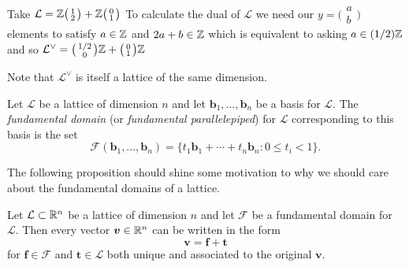 \begin{example}
    Take $\mathcal{L}= \mathbb{Z} 
        \big(\begin{smallmatrix} 1\\2 \end{smallmatrix}\big) + 
        \mathbb{Z} \big(\begin{smallmatrix} 0\\ 1 \end{smallmatrix}\big)$
        To calculate the dual of $\mathcal{L}$ we need our $y = \big(\begin{smallmatrix}
          a\\b\end{smallmatrix}\big)$ elements to satisfy $a \in \mathbb{Z}$ and $2a + b \in \mathbb{Z}$ which is equivalent to asking $a \in (1/2)\mathbb{Z}$ and so $\mathcal{L}^{\vee} = \big(\begin{smallmatrix}
          1/2\\0
        \end{smallmatrix}\big)\mathbb{Z} + \big(\begin{smallmatrix}
          0\\1
        \end{smallmatrix}\big) \mathbb{Z}$
\end{example}

Note that $\mathcal{L}^{\vee}$ is itself a lattice of the same dimension.

\begin{definition} \label{fundamental}
    Let $\mathcal{L}$ be a lattice of dimension $n$ and let $\bm{b}_1, \dots, \bm{b}_n$ be a basis for $\mathcal{L}$. The \textit{fundamental domain} (or \textit{fundamental parallelepiped}) for $\mathcal{L}$ corresponding to this basis is the set
    $$ \mathcal{F}(\bm{b}_1, \dots, \bm{b}_n) = \{t_1\bm{b}_1 + \cdots + t_n\bm{b}_n : 0 \leq t_i < 1 \}.$$
\end{definition}

The following proposition should shine some motivation to why we should care about the fundamental domains of a lattice.

\begin{proposition}
    Let $\mathcal{L} \subset \mathbb{R}^n$ be a lattice of dimension $n$ and let $\mathcal{F}$ be a fundamental domain for $\mathcal{L}$. Then every vector $\boldsymbol{v} \in \mathbb{R}^n$ can be written in the form 
    $$\bm{v} = \bm{f} + \bm{t}$$
    for $\bm{f} \in \mathcal{F}$ and $\bm{t} \in \mathcal{L}$ both unique and associated to the original $\bm{v}$.
\end{proposition}


